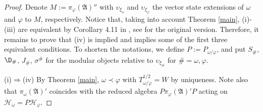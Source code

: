 \documentclass[12pt]{amsart}
\numberwithin{equation}{section}
\def\ch{{\mathcal H}}
\def\ga{{\mathfrak A}} \def\gpa{{\mathfrak a}}
\def\s{\sigma} \def\S{\Sigma}
\def\f{\varphi}\def\ff{\phi} \def\F{\Phi}
\def\om{\omega} \def\Om{\Omega}
\begin{document}
\begin{proof}
Denote $M:=\pi_\f(\ga)''$ with $\upsilon_{\xi_\om}$ and $\upsilon_{\xi_\f}$ the vector state extensions of $\om$ and $\f$ to $M$, respectively. Notice that, taking into account Theorem \ref{main}, (i)-(iii) are equivalent by Corollary 4.11 in \cite{S}, see \cite{PT} for the original version. Therefore, it remains to prove that (iv) is implied and implies some of the first three equivalent conditions. To shorten the notations, we define $P:=P_{\om/\f}$, and
put $S_{\#}$, $\D_{\#}$, $J_{\#}$, $\s^{\#}$ for the modular objects relative to 
$\upsilon_{\xi_\#}$ for $\#=\om, \f$.

(i)$\Rightarrow$(iv) By Theorem \ref{main}, $\om\prec\f$ with $T^{1/2}_{\om/\f}=W$ by uniqueness. Note also that $\pi_\om(\ga)'$ coincides with the reduced algebra $P\pi_\f(\ga)'P$ acting on 
$\ch_\om=P\ch_\f$. 


\end{proof}
\end{document}
